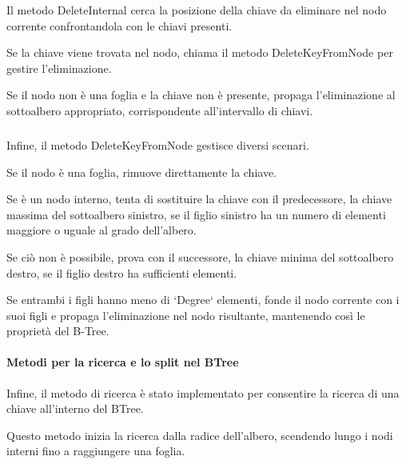 \documentclass[12pt,a4paper,openright,twoside]{book}
\begin{document}
                    

                    Il metodo DeleteInternal cerca la posizione della chiave da eliminare nel nodo corrente confrontandola con le chiavi presenti.

                    Se la chiave viene trovata nel nodo, chiama il metodo DeleteKeyFromNode per gestire l'eliminazione.

                    Se il nodo non è una foglia e la chiave non è presente, propaga l'eliminazione al sottoalbero appropriato, corrispondente all'intervallo di chiavi.

                    \subparagraph*{}

                    

                    Infine, il metodo DeleteKeyFromNode gestisce diversi scenari.

                    Se il nodo è una foglia, rimuove direttamente la chiave.

                    Se è un nodo interno, tenta di sostituire la chiave con il predecessore, la chiave massima del sottoalbero sinistro, se il figlio sinistro ha un numero di elementi maggiore o uguale al grado dell'albero.

                    Se ciò non è possibile, prova con il successore, la chiave minima del sottoalbero destro, se il figlio destro ha sufficienti elementi.

                    Se entrambi i figli hanno meno di `Degree` elementi, fonde il nodo corrente con i suoi figli e propaga l'eliminazione nel nodo risultante, mantenendo così le proprietà del B-Tree.

                \paragraph{Metodi per la ricerca e lo split nel BTree}

                    Infine, il metodo di ricerca è stato implementato per consentire la ricerca di una chiave all'interno del BTree.

                    

                    Questo metodo inizia la ricerca dalla radice dell'albero, scendendo lungo i nodi interni fino a raggiungere una foglia.
\end{document}
